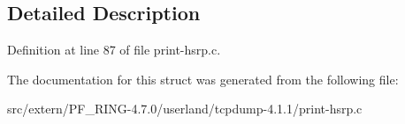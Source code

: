 \subsection{Detailed Description}


Definition at line 87 of file print-\/hsrp.c.



The documentation for this struct was generated from the following file:\begin{DoxyCompactItemize}
\item 
src/extern/PF\_\-RING-\/4.7.0/userland/tcpdump-\/4.1.1/print-\/hsrp.c\end{DoxyCompactItemize}
